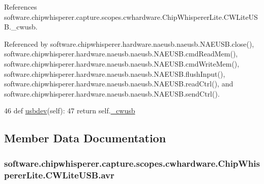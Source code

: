 References software.\+chipwhisperer.\+capture.\+scopes.\+cwhardware.\+Chip\+Whisperer\+Lite.\+C\+W\+Lite\+U\+S\+B.\+\_\+cwusb.



Referenced by software.\+chipwhisperer.\+hardware.\+naeusb.\+naeusb.\+N\+A\+E\+U\+S\+B.\+close(), software.\+chipwhisperer.\+hardware.\+naeusb.\+naeusb.\+N\+A\+E\+U\+S\+B.\+cmd\+Read\+Mem(), software.\+chipwhisperer.\+hardware.\+naeusb.\+naeusb.\+N\+A\+E\+U\+S\+B.\+cmd\+Write\+Mem(), software.\+chipwhisperer.\+hardware.\+naeusb.\+naeusb.\+N\+A\+E\+U\+S\+B.\+flush\+Input(), software.\+chipwhisperer.\+hardware.\+naeusb.\+naeusb.\+N\+A\+E\+U\+S\+B.\+read\+Ctrl(), and software.\+chipwhisperer.\+hardware.\+naeusb.\+naeusb.\+N\+A\+E\+U\+S\+B.\+send\+Ctrl().


\begin{DoxyCode}
46     \textcolor{keyword}{def }\hyperlink{classsoftware_1_1chipwhisperer_1_1capture_1_1scopes_1_1cwhardware_1_1ChipWhispererLite_1_1CWLiteUSB_ab2549a942c43837fcaba893dca65b824}{usbdev}(self):
47         \textcolor{keywordflow}{return} self.\hyperlink{classsoftware_1_1chipwhisperer_1_1capture_1_1scopes_1_1cwhardware_1_1ChipWhispererLite_1_1CWLiteUSB_a4a1a228adda63ac28012a6dab7998abd}{\_cwusb}\end{DoxyCode}


\subsection{Member Data Documentation}
\hypertarget{classsoftware_1_1chipwhisperer_1_1capture_1_1scopes_1_1cwhardware_1_1ChipWhispererLite_1_1CWLiteUSB_aa7729cab7e3f9e151f8d53991393687f}{}
\subsubsection[{avr}]{\setlength{\rightskip}{0pt plus 5cm}software.\+chipwhisperer.\+capture.\+scopes.\+cwhardware.\+Chip\+Whisperer\+Lite.\+C\+W\+Lite\+U\+S\+B.\+avr}\label{classsoftware_1_1chipwhisperer_1_1capture_1_1scopes_1_1cwhardware_1_1ChipWhispererLite_1_1CWLiteUSB_aa7729cab7e3f9e151f8d53991393687f}
\hypertarget{classsoftware_1_1chipwhisperer_1_1capture_1_1scopes_1_1cwhardware_1_1ChipWhispererLite_1_1CWLiteUSB_a1cb11a0145bd9fd9bec059aada1a9378}{}
